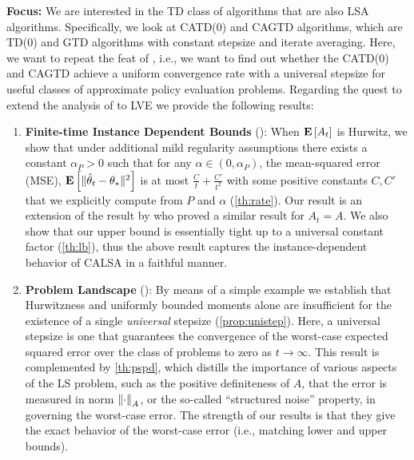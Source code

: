 \textbf{Focus:} We are interested in the TD class of algorithms that are also LSA algorithms. Specifically, we look at CATD(0) and CAGTD algorithms, which are TD(0) and GTD algorithms with constant stepsize and iterate averaging. Here, we want to repeat the feat of \cite{bach}, i.e., we want to find out whether the CATD(0) and CAGTD achieve a uniform convergence rate with a universal stepsize for useful classes of approximate policy evaluation problems. 
\fi
Regarding the quest to extend the analysis of  \citet{bach-moulines} to LVE we provide the following results:
\begin{enumerate}[topsep=0pt,itemsep=1pt,wide, labelwidth=!, labelindent=0pt,label=\emph{\arabic*}.]
\item \textbf{Finite-time Instance Dependent Bounds} (): 
When $\mathbf{E}\left[A_t\right]$ is Hurwitz, we show that under additional mild regularity assumptions 
there exists a constant $\alpha_P>0$ such that for any $\alpha\in (0,\alpha_P)$,
the mean-squared error (MSE), $\mathbf{E}\left[\| \hat{\theta}_t-\theta_*\|^2\right]$
is at most $\frac{C}{t}+\frac{C'}{t^2}$ 
with some positive constants $C,C'$ that we explicitly compute from $P$ and $\alpha$
(\cref{th:rate}).
Our result is an extension of the result by \citet{polyak-judisky} who proved a similar result
for $A_t=A$. 
We also show that our upper bound is essentially tight up to a universal constant
factor (\cref{th:lb}), thus the above result captures the instance-dependent
behavior of CALSA in a faithful manner.
\item \textbf{Problem Landscape} (): 
By means of a simple example we establish that 
Hurwitzness and uniformly bounded moments 
alone are insufficient for the existence of a single \emph{universal} stepsize (\cref{prop:unistep}).
Here, a universal stepsize is one that guarantees the convergence of the worst-case expected squared 
error over the class of problems to zero as $t\to\infty$.
This result is complemented by \cref{th:pspd}, which distills the importance of various aspects
of the LS problem, such as the positive definiteness of $A$, that the error is measured in norm $\left\| \cdot\right\|_A$, or the so-called ``structured noise'' property, in governing the worst-case
error. The strength of our results is that they give the exact behavior of the worst-case error (i.e.,
matching lower and upper bounds).

\end{enumerate}
